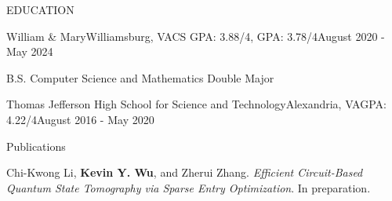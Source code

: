 \documentclass{resume} %
\begin{document}
\begin{rSection}{EDUCATION}
    \begin{rSubsection} {William \& Mary}{Williamsburg, VA}{CS GPA: 3.88/4, GPA: 3.78/4}{August 2020 - May 2024}
        \startitems
        \item B.S. Computer Science and Mathematics Double Major
    \end{rSubsection}

    \begin{rSubsection}{Thomas Jefferson High School for Science and Technology}{Alexandria, VA}{GPA: 4.22/4}{August 2016 - May 2020} \end{rSubsection} 
\end{rSection}

\begin{rSection}{Publications}
    \item Chi-Kwong Li, \textbf{Kevin Y. Wu}, and Zherui Zhang. \textit{Efficient Circuit-Based Quantum State Tomography via Sparse Entry Optimization}. In preparation.  
\end{rSection}
\end{document}
